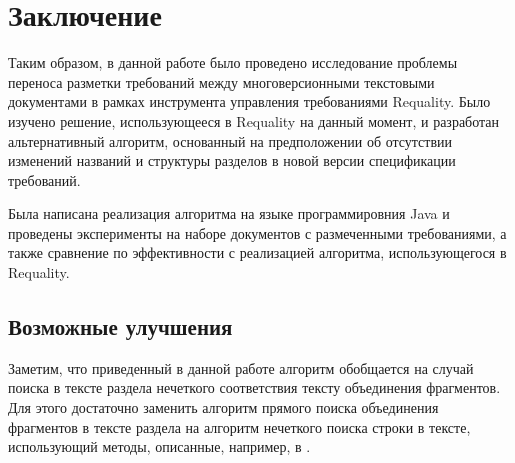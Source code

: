 \section{Заключение}
\label{sec:Chapter6} 

Таким образом, в данной работе было проведено исследование проблемы переноса разметки требований между многоверсионными текстовыми документами в рамках инструмента управления требованиями Requality. Было изучено решение, использующееся в Requality на данный момент, и разработан альтернативный алгоритм, основанный на предположении об отсутствии изменений названий и структуры разделов в новой версии спецификации требований.

Была написана реализация алгоритма на языке программировния Java и проведены эксперименты на наборе документов с размеченными требованиями, а также сравнение по эффективности с реализацией алгоритма, использующегося в Requality.

\subsection{Возможные улучшения}

Заметим, что приведенный в данной работе алгоритм обобщается на случай поиска в тексте раздела нечеткого соответствия тексту объединения фрагментов. Для этого достаточно заменить алгоритм прямого поиска объединения фрагментов в тексте раздела на алгоритм нечеткого поиска строки в тексте, использующий методы, описанные, например, в \cite{web:StrNotExact}.